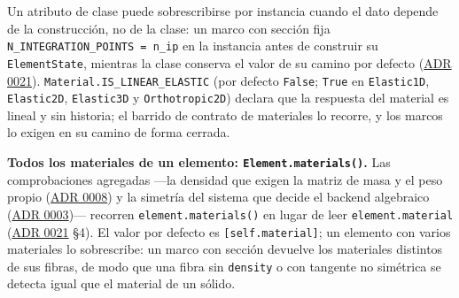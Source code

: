\documentclass[11pt,oneside]{report}
\begin{document}
Un atributo de clase puede sobrescribirse por instancia cuando el dato depende de la construcción, no de la clase: un marco con sección fija \texttt{N\_\allowbreak{}INTEGRATION\_\allowbreak{}POINTS = n\_\allowbreak{}ip} en la instancia antes de construir su \texttt{ElementState}, mientras la clase conserva el valor de su camino por defecto (\hyperref[adr:0021]{ADR 0021}). \texttt{Material.\allowbreak{}IS\_\allowbreak{}LINEAR\_\allowbreak{}ELASTIC} (por defecto \texttt{False}; \texttt{True} en \texttt{Elastic1D}, \texttt{Elastic2D}, \texttt{Elastic3D} y \texttt{Orthotropic2D}) declara que la respuesta del material es lineal y sin historia; el barrido de contrato de materiales lo recorre, y los marcos lo exigen en su camino de forma cerrada.

\textbf{Todos los materiales de un elemento: \texttt{Element.\allowbreak{}materials()}.} Las comprobaciones agregadas ---la densidad que exigen la matriz de masa y el peso propio (\hyperref[adr:0008]{ADR 0008}) y la simetría del sistema que decide el backend algebraico (\hyperref[adr:0003]{ADR 0003})--- recorren \texttt{element.\allowbreak{}materials()} en lugar de leer \texttt{element.material} (\hyperref[adr:0021]{ADR 0021} §4). El valor por defecto es \texttt{[self.material]}; un elemento con varios materiales lo sobrescribe: un marco con sección devuelve los materiales distintos de sus fibras, de modo que una fibra sin \texttt{density} o con tangente no simétrica se detecta igual que el material de un sólido.
\end{document}
